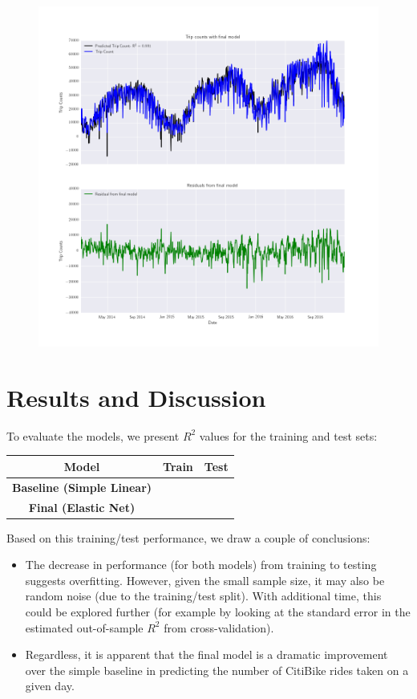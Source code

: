 \documentclass[12pt]{article}
\begin{document}
\begin{figure}[H]
   \centering
   \includegraphics[width=\textwidth]{figures/final_plot.png}
\end{figure}
  
 \section{Results and Discussion}
 
To evaluate the models, we present $R^2$ values for the training and test sets:
\begin{center}
\begin{tabular} {| c | c | c |}
\hline
\textbf{Model} & \textbf{Train} & \textbf{Test} \\
\hline
\textbf{Baseline (Simple Linear)} &   &  \\
\hline
\textbf{Final (Elastic Net)} &   &  \\
\hline
\end{tabular}
\end{center}

Based on this training/test performance, we draw a couple of conclusions:
\begin{itemize}
\item The decrease in performance (for both models) from training to testing suggests overfitting. However, given the small sample size, it may also be random noise (due to the training/test split). With additional time, this could be explored further (for example by looking at the standard error in the estimated out-of-sample $R^2$ from cross-validation). 
\item Regardless, it is apparent that the final model is a dramatic improvement over the simple baseline in predicting the number of CitiBike rides taken on a given day.
\end{itemize}
\end{document}
